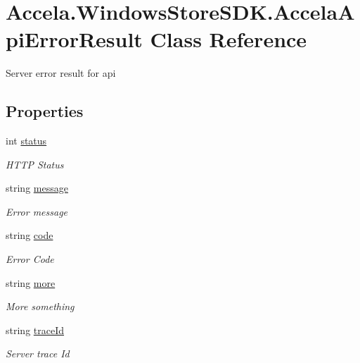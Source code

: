 \hypertarget{class_accela_1_1_windows_store_s_d_k_1_1_accela_api_error_result}{\section{Accela.\+Windows\+Store\+S\+D\+K.\+Accela\+Api\+Error\+Result Class Reference}
\label{class_accela_1_1_windows_store_s_d_k_1_1_accela_api_error_result}
}


Server error result for api  


\subsection*{Properties}
\begin{DoxyCompactItemize}
\item 
int \hyperlink{class_accela_1_1_windows_store_s_d_k_1_1_accela_api_error_result_a6d3879256e50f9c91d0de6ce3e17e127}{status}
\begin{DoxyCompactList}\small\item\em H\+T\+T\+P Status \end{DoxyCompactList}\item 
string \hyperlink{class_accela_1_1_windows_store_s_d_k_1_1_accela_api_error_result_ad7d453c085223b5f748011ebad6fe923}{message}
\begin{DoxyCompactList}\small\item\em Error message \end{DoxyCompactList}\item 
string \hyperlink{class_accela_1_1_windows_store_s_d_k_1_1_accela_api_error_result_a5465e812baf5f4f7376fed6d44343280}{code}
\begin{DoxyCompactList}\small\item\em Error Code \end{DoxyCompactList}\item 
string \hyperlink{class_accela_1_1_windows_store_s_d_k_1_1_accela_api_error_result_a1ecd1818eb58c4ec8805d827b45dac2a}{more}
\begin{DoxyCompactList}\small\item\em More something \end{DoxyCompactList}\item 
string \hyperlink{class_accela_1_1_windows_store_s_d_k_1_1_accela_api_error_result_ab4dde41503b018bc17e2e85718ee57e4}{trace\+Id}
\begin{DoxyCompactList}\small\item\em Server trace Id \end{DoxyCompactList}\end{DoxyCompactItemize}


